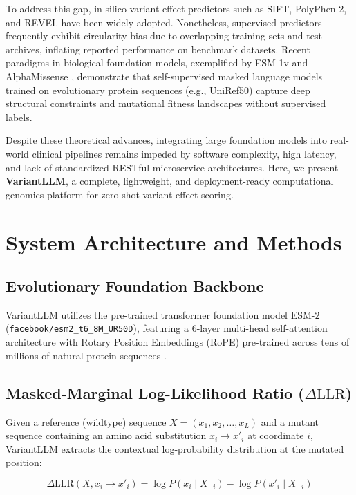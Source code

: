 \documentclass[10pt,twocolumn,letterpaper]{article}
\begin{document}
To address this gap, in silico variant effect predictors such as SIFT, PolyPhen-2, and REVEL have been widely adopted. Nonetheless, supervised predictors frequently exhibit circularity bias due to overlapping training sets and test archives, inflating reported performance on benchmark datasets. Recent paradigms in biological foundation models, exemplified by ESM-1v \cite{meier2021} and AlphaMissense \cite{cheng2023}, demonstrate that self-supervised masked language models trained on evolutionary protein sequences (e.g., UniRef50) capture deep structural constraints and mutational fitness landscapes without supervised labels.

Despite these theoretical advances, integrating large foundation models into real-world clinical pipelines remains impeded by software complexity, high latency, and lack of standardized RESTful microservice architectures. Here, we present \textbf{VariantLLM}, a complete, lightweight, and deployment-ready computational genomics platform for zero-shot variant effect scoring.

\section{System Architecture and Methods}

\subsection{Evolutionary Foundation Backbone}
VariantLLM utilizes the pre-trained transformer foundation model $\text{ESM-2}$ (\texttt{facebook/esm2\_t6\_8M\_UR50D}), featuring a 6-layer multi-head self-attention architecture with Rotary Position Embeddings (RoPE) pre-trained across tens of millions of natural protein sequences \cite{lin2023}.

\subsection{Masked-Marginal Log-Likelihood Ratio ($\Delta\text{LLR}$)}
Given a reference (wildtype) sequence $X = (x_1, x_2, \dots, x_L)$ and a mutant sequence containing an amino acid substitution $x_i \to x'_i$ at coordinate $i$, VariantLLM extracts the contextual log-probability distribution at the mutated position:

\begin{equation}
\Delta \text{LLR}(X, x_i \to x'_i) = \log P(x_i \mid X_{-i}) - \log P(x'_i \mid X_{-i})
\end{equation}
\end{document}
